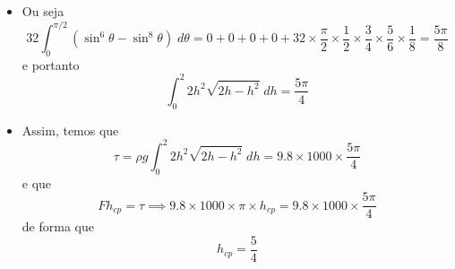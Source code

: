 \documentclass[brazilian,11pt]{article}
\begin{document}
\begin{itemize}
    \item Ou seja
        \[
            32\int_0^{\pi/2}(\sin^6\theta-\sin^8\theta)\; d\theta =
            0+0+0+0+
            32\times\frac{\pi}{2}\times\frac{1}{2}\times\frac{3}{4}
            \times\frac{5}{6}\times\frac{1}{8} = \frac{5\pi}{8}
        \]
        e portanto
        \[
            \int_0^2 2h^2\sqrt{2h-h^2}\; dh = \frac{5\pi}{4}
        \]
    \item Assim, temos que
        \[
            \tau=\rho g 
            \int_0^2 2h^2\sqrt{2h-h^2}\; dh = 
            9.8 \times 1000 \times \frac{5\pi}{4}
        \]
        e que
        \[
            F h_{cp} = \tau \implies 
            9.8 \times 1000 \times \pi \times h_{cp} =
            9.8 \times 1000 \times \frac{5\pi}{4}
        \]
        de forma que
        \[
            h_{cp}=\frac{5}{4}
        \]
\end{itemize}
\end{document}
